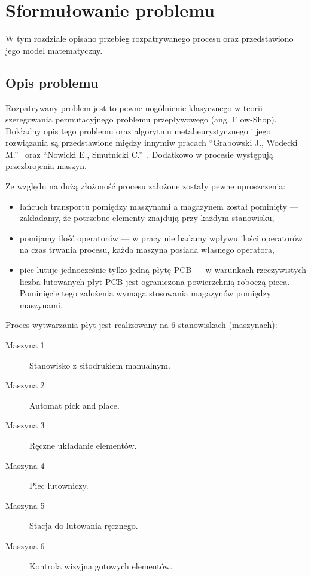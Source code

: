 \chapter{Sformułowanie problemu}
W tym rozdziale opisano przebieg rozpatrywanego procesu oraz przedstawiono jego model matematyczny.



\section{Opis problemu}
Rozpatrywany problem jest to pewne uogólnienie klasycznego w teorii szeregowania permutacyjnego problemu przepływowego (ang. Flow-Shop). Dokładny opis tego problemu oraz algorytmu metaheurystycznego i jego rozwiązania są przedstawione między innymi\linebreak w pracach ``Grabowski J., Wodecki M.''~\cite{GRABOWSKI20041891} oraz ``Nowicki E., Smutnicki C.''~\cite{NOWICKI1996160}. Dodatkowo w procesie występują przezbrojenia maszyn.

\breakparagraph{}
Ze względu na dużą złożoność procesu założone zostały pewne uproszczenia:
\begin{itemize}
	\item łańcuch transportu pomiędzy maszynami a magazynem został pominięty --- zakładamy, że potrzebne elementy znajdują przy każdym stanowisku,
	\item pomijamy ilość operatorów --- w pracy nie badamy wpływu ilości operatorów na czas trwania procesu, każda maszyna posiada własnego operatora,
	\item piec lutuje jednocześnie tylko jedną płytę PCB --- w warunkach rzeczywistych liczba lutowanych płyt PCB jest ograniczona powierzchnią roboczą pieca. Pominięcie tego założenia wymaga stosowania magazynów pomiędzy maszynami.
\end{itemize}

\breakparagraph{}
Proces wytwarzania płyt jest realizowany na 6 stanowiskach (maszynach):
\begin{description}
	\item[Maszyna 1] Stanowisko z sitodrukiem manualnym.
	\item[Maszyna 2] Automat pick and place.
	\item[Maszyna 3] Ręczne układanie elementów.
	\item[Maszyna 4] Piec lutowniczy.
	\item[Maszyna 5] Stacja do lutowania ręcznego.
	\item[Maszyna 6] Kontrola wizyjna gotowych elementów.
\end{description}

